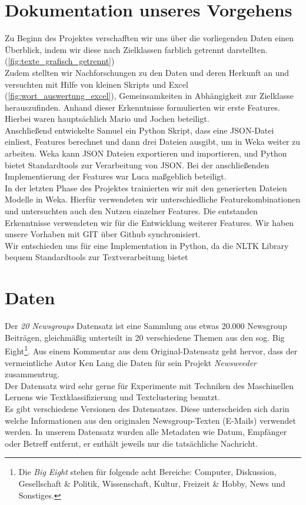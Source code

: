 \documentclass[
	11pt,
	a4paper
]{scrartcl}
\begin{document}
\section{Dokumentation unseres Vorgehens}
Zu Beginn des Projektes verschafften wir uns über die vorliegenden Daten einen Überblick,
indem wir diese nach Zielklassen farblich getrennt darstellten. (\autoref{fig:texte_grafisch_getrennt})\\
Zudem stellten wir Nachforschungen zu den Daten und deren Herkunft an und versuchten mit Hilfe von kleinen
Skripts und Excel (\autoref{fig:wort_auswertung_excel}), Gemeinsamkeiten in Abhängigkeit zur Zielklasse
herauszufinden. Anhand dieser Erkenntnisse formulierten wir erste Features. Hierbei waren hauptsächlich Mario
und Jochen beteiligt.\\

Anschließend entwickelte Samuel ein Python Skript, dass eine JSON-Datei einliest, Features berechnet und
dann drei Dateien ausgibt, um in Weka weiter zu arbeiten. Weka kann JSON Dateien exportieren und importieren, 
und Python bietet Standardtools zur Verarbeitung von JSON. Bei der anschließenden Implementierung der Features war Luca
maßgeblich beteiligt.\\

In der letzten Phase des Projektes trainierten wir mit den generierten Dateien Modelle in Weka. Hierfür verwendeten wir
unterschiedliche Featurekombinationen und untersuchten auch den Nutzen einzelner Features. Die entstanden Erkenntnisse
verwendeten wir für die Entwicklung weiterer Features. Wir haben unsere Vorhaben mit GIT über Github synchronisiert.\\

Wir entschieden uns für eine Implementation in Python, da die NLTK Library bequem Standardtools zur Textverarbeitung bietet


\section{Daten}
Der \emph{20 Newsgroups} Datensatz ist eine Sammlung aus etwas 20.000 Newsgroup Beiträgen, gleichmäßig unterteilt in 20
verschiedene Themen aus den sog. Big Eight\footnote{Die \emph{Big Eight} stehen für folgende acht Bereiche: Computer,
Diskussion, Gesellschaft \& Politik, Wissenschaft, Kultur, Freizeit \& Hobby, News und Sonstiges.}. Aus einem Kommentar
aus dem Original-Datensatz geht hervor, dass der vermeintliche Autor Ken Lang die Daten für sein Projekt \emph{Newsweeder}
zusammentrug.\\
Der Datensatz wird sehr gerne für Experimente mit Techniken des Maschinellen Lernens wie Textklassifizierung und
Textclustering  benutzt.\\
Es gibt verschiedene Versionen des Datensatzes. Diese unterscheiden sich darin welche Informationen aus den originalen
Newsgroup-Texten (E-Mails) verwendet werden. In unserem Datensatz wurden alle Metadaten wie Datum, Empfänger oder Betreff
entfernt, er enthält jeweils nur die tatsächliche Nachricht.\\
\end{document}
